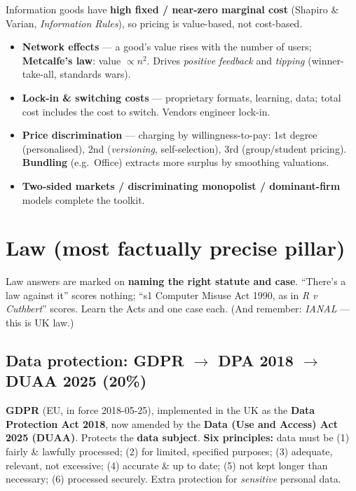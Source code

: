 \documentclass[11pt,a4paper]{article}
\begin{document}
\begin{useful}
Information goods have \textbf{high fixed / near-zero marginal cost} (Shapiro \& Varian, \emph{Information Rules}), so pricing is value-based, not cost-based.
\begin{itemize}[leftmargin=*,itemsep=1pt]
  \item \textbf{Network effects} --- a good's value rises with the number of users; \textbf{Metcalfe's law}: value $\propto n^2$. Drives \emph{positive feedback} and \emph{tipping} (winner-take-all, standards wars).
  \item \textbf{Lock-in \& switching costs} --- proprietary formats, learning, data; total cost includes the cost to switch. Vendors engineer lock-in.
  \item \textbf{Price discrimination} --- charging by willingness-to-pay: 1st degree (personalised), 2nd (\emph{versioning}, self-selection), 3rd (group/student pricing). \textbf{Bundling} (e.g.\ Office) extracts more surplus by smoothing valuations.
  \item \textbf{Two-sided markets / discriminating monopolist / dominant-firm} models complete the toolkit.
\end{itemize}
\end{useful}

\section{Law (most factually precise pillar)}

\begin{gotcha}
Law answers are marked on \textbf{naming the right statute and case}. ``There's a law against it'' scores nothing; ``s1 Computer Misuse Act 1990, as in \emph{R v Cuthbert}'' scores. Learn the Acts and one case each. (And remember: \emph{IANAL} --- this is UK law.)
\end{gotcha}

\subsection{Data protection: GDPR $\to$ DPA 2018 $\to$ DUAA 2025 (20\%)}

\begin{must}
\textbf{GDPR} (EU, in force 2018-05-25), implemented in the UK as the \textbf{Data Protection Act 2018}, now amended by the \textbf{Data (Use and Access) Act 2025 (DUAA)}. Protects the \textbf{data subject}. \textbf{Six principles:} data must be (1) fairly \& lawfully processed; (2) for limited, specified purposes; (3) adequate, relevant, not excessive; (4) accurate \& up to date; (5) not kept longer than necessary; (6) processed securely. Extra protection for \emph{sensitive} personal data.
\end{must}
\end{document}
